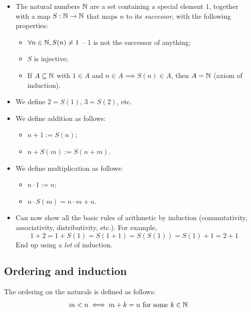 \documentclass{../../template/note}
\begin{document}
    \begin{itemize}
        \item The natural numbers \(\mathbb N\) are a set containing a special element \(1\), together with a map \(S: \mathbb N \to \mathbb N\) that maps \(n\) to its \emph{successor}, with the following properties:
        \begin{itemize}
            \item \(\forall n \in \mathbb N, S(n) \neq 1\) -- 1 is not the successor of anything;
            \item \(S\) is injective;
            \item If \(A \subseteq \mathbb N\) with \(1 \in A\) and \(n \in A \implies S(n) \in A\), then \(A = \mathbb N\) (axiom of induction).
        \end{itemize}
        \item We define \(2 = S(1)\), \(3 = S(2)\), etc.
        \item We define addition as follows:
        \begin{itemize}
            \item \(n+1 := S(n)\);
            \item \(n+S(m) := S(n+m)\).
        \end{itemize}
        \item We define multiplication as follows:
        \begin{itemize}
            \item \(n \cdot 1 := n\);
            \item \(n \cdot S(m) = n \cdot m + n\).
        \end{itemize}
        \item Can now show all the basic rules of arithmetic by induction (commutativity, associativity, distributivity, etc.). For example,
        \[
            1 + 2 = 1 + S(1) = S(1 + 1) = S(S(1)) = S(1) + 1 = 2 + 1
        \]
        End up using a \emph{lot} of induction.
        
        
        
        
    \end{itemize}
    

    \subsection{Ordering and induction}

    \begin{definition}[Ordering]
        The ordering on the naturals is defined as follows:
        \[  
            m < n \iff m + k = n \text{ for some } k \in \mathbb N
        \]
    \end{definition}
    
\end{document}
